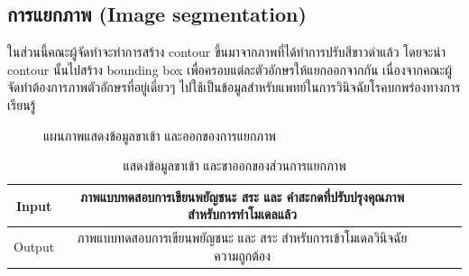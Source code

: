 \documentclass[12pt,oneside,openright,a4paper]{cpe-thai-project}
\begin{document}
  \subsection{การแยกภาพ (Image segmentation)}
  ในส่วนนี้คณะผู้จัดทำจะทำการสร้าง contour ขึ้นมาจากภาพที่ได้ทำการปรับสีขาวดำแล้ว โดยจะนำ contour นั้นไปสร้าง bounding box 
  เพื่อครอบแต่ละตัวอักษรให้แยกออกจากกัน เนื่องจากคณะผู้จัดทำต้องการภาพตัวอักษรที่อยู่เดี่ยวๆ ไปใช้เป็นข้อมูลสำหรับแพทย์ในการวินิจฉัยโรคบกพร่องทางการเรียนรู้ 
  \begin{figure}[!ht]\centering
    \setlength{\fboxrule}{0.2mm} %
    \setlength{\fboxsep}{1cm}
    \caption{แผนภาพแสดงข้อมูลขาเข้า และออกของการแยกภาพ}\label{fig:system}
   \end{figure}
  \begin{table}[!h]\centering
    \caption{แสดงข้อมูลขาเข้า และขาออกของส่วนการแยกภาพ}\label{tbl:application1}

    \begin{tabular}{c|c|l|rr} \hline
    Input & ภาพแบบทดสอบการเขียนพยัญชนะ สระ และ คำสะกดที่ปรับปรุงคุณภาพสำหรับการทำโมเดลแล้ว  \\ \hline
    Output & ภาพแบบทดสอบการเขียนพยัญชนะ และ สระ สำหรับการเข้าโมเดลวินิจฉัยความถูกต้อง \\ \hline
    \end{tabular}
    \end{table}

  \newpage
\end{document}
